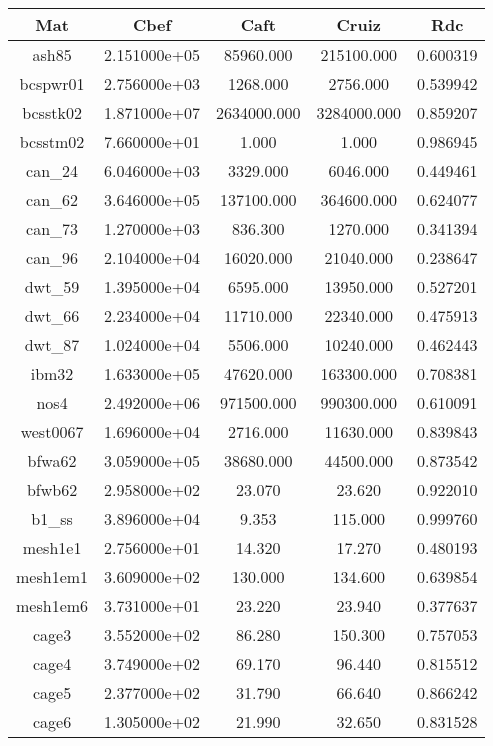 \begin{table}[h]
  \begin{tabular}{ccccc}
    \hline
    Mat & Cbef & Caft & Cruiz & Rdc\\
    \hline
    ash85 & 2.151000e+05 & 85960.000 & 215100.000 & 0.600319\\
    bcspwr01 & 2.756000e+03 & 1268.000 & 2756.000 & 0.539942\\
    bcsstk02 & 1.871000e+07 & 2634000.000 & 3284000.000 & 0.859207\\
    bcsstm02 & 7.660000e+01 & 1.000 & 1.000 & 0.986945\\
    can\_24 & 6.046000e+03 & 3329.000 & 6046.000 & 0.449461\\
    can\_62 & 3.646000e+05 & 137100.000 & 364600.000 & 0.624077\\
    can\_73 & 1.270000e+03 & 836.300 & 1270.000 & 0.341394\\
    can\_96 & 2.104000e+04 & 16020.000 & 21040.000 & 0.238647\\
    dwt\_59 & 1.395000e+04 & 6595.000 & 13950.000 & 0.527201\\
    dwt\_66 & 2.234000e+04 & 11710.000 & 22340.000 & 0.475913\\
    dwt\_87 & 1.024000e+04 & 5506.000 & 10240.000 & 0.462443\\
    ibm32 & 1.633000e+05 & 47620.000 & 163300.000 & 0.708381\\
    nos4 & 2.492000e+06 & 971500.000 & 990300.000 & 0.610091\\
    west0067 & 1.696000e+04 & 2716.000 & 11630.000 & 0.839843\\
    bfwa62 & 3.059000e+05 & 38680.000 & 44500.000 & 0.873542\\
    bfwb62 & 2.958000e+02 & 23.070 & 23.620 & 0.922010\\
    b1\_ss & 3.896000e+04 & 9.353 & 115.000 & 0.999760\\
    mesh1e1 & 2.756000e+01 & 14.320 & 17.270 & 0.480193\\
    mesh1em1 & 3.609000e+02 & 130.000 & 134.600 & 0.639854\\
    mesh1em6 & 3.731000e+01 & 23.220 & 23.940 & 0.377637\\
    cage3 & 3.552000e+02 & 86.280 & 150.300 & 0.757053\\
    cage4 & 3.749000e+02 & 69.170 & 96.440 & 0.815512\\
    cage5 & 2.377000e+02 & 31.790 & 66.640 & 0.866242\\
    cage6 & 1.305000e+02 & 21.990 & 32.650 & 0.831528\\

\end{tabular}
\end{table}
